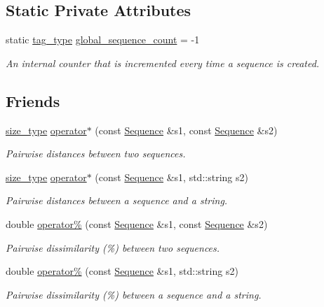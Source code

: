 \subsection*{Static Private Attributes}
\begin{DoxyCompactItemize}
\item 
static \hyperlink{namespaceretrocombinator_afd7c6eb4293e8c4d12827609a9a34b9b}{tag\+\_\+type} \hyperlink{classretrocombinator_1_1Sequence_a486f1b680452f7162ee9a895c2871f92}{global\+\_\+sequence\+\_\+count} = -\/1
\begin{DoxyCompactList}\small\item\em An internal counter that is incremented every time a sequence is created. \end{DoxyCompactList}\end{DoxyCompactItemize}
\subsection*{Friends}
\begin{DoxyCompactItemize}
\item 
\hyperlink{namespaceretrocombinator_a8e1541b50cee66a791df4c437ccbb385}{size\+\_\+type} \hyperlink{classretrocombinator_1_1Sequence_a8cd9dc2cfea97399387e2876ee028c32}{operator$\ast$} (const \hyperlink{classretrocombinator_1_1Sequence}{Sequence} \&s1, const \hyperlink{classretrocombinator_1_1Sequence}{Sequence} \&s2)
\begin{DoxyCompactList}\small\item\em Pairwise distances between two sequences. \end{DoxyCompactList}\item 
\hyperlink{namespaceretrocombinator_a8e1541b50cee66a791df4c437ccbb385}{size\+\_\+type} \hyperlink{classretrocombinator_1_1Sequence_afdd1af7009804b182798c40d25bb1bb5}{operator$\ast$} (const \hyperlink{classretrocombinator_1_1Sequence}{Sequence} \&s1, std\+::string s2)
\begin{DoxyCompactList}\small\item\em Pairwise distances between a sequence and a string. \end{DoxyCompactList}\item 
double \hyperlink{classretrocombinator_1_1Sequence_a951eb38b75bb0b9a808e3a8bc7170a09}{operator\%} (const \hyperlink{classretrocombinator_1_1Sequence}{Sequence} \&s1, const \hyperlink{classretrocombinator_1_1Sequence}{Sequence} \&s2)
\begin{DoxyCompactList}\small\item\em Pairwise dissimilarity (\%) between two sequences. \end{DoxyCompactList}\item 
double \hyperlink{classretrocombinator_1_1Sequence_a56fd21ad6db6a3cb7f7f4b9b5b6c84ea}{operator\%} (const \hyperlink{classretrocombinator_1_1Sequence}{Sequence} \&s1, std\+::string s2)
\begin{DoxyCompactList}\small\item\em Pairwise dissimilarity (\%) between a sequence and a string. \end{DoxyCompactList}\end{DoxyCompactItemize}


